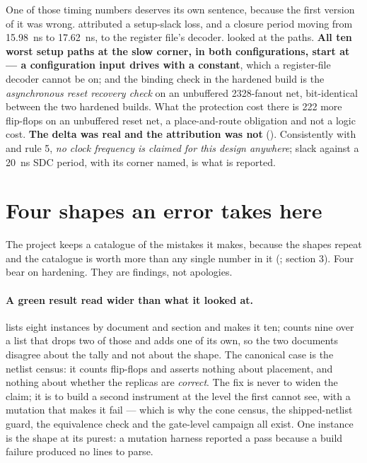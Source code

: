 One of those timing numbers deserves its own sentence, because the first
version of it was wrong.  attributed a
setup-slack loss, and a closure period moving from
\SI{15.98}{\nano\second} to \SI{17.62}{\nano\second}, to the register
file's decoder.  looked at the paths. \textbf{All ten worst
setup paths at the slow corner, in both configurations, start at
 --- a configuration input 
drives with a constant}, which a register-file decoder cannot be on; and
the binding check in the hardened build is the \emph{asynchronous reset
recovery check} on an unbuffered \num{2328}-fanout net, bit-identical
between the two hardened builds. What the protection cost there is 222
more flip-flops on an unbuffered reset net, a place-and-route obligation
and not a logic cost. \textbf{The delta was real and the attribution was
not} (). Consistently with
 and  rule 5, \emph{no clock
frequency is claimed for this design anywhere}; slack against a
\SI{20}{\nano\second} SDC period, with its corner named, is what is
reported.

\section{Four shapes an error takes here}
\label{sec:harden-shapes}

The project keeps a catalogue of the mistakes it makes, because the
shapes repeat and the catalogue is worth more than any single number in
it (;  section 3). Four bear on
hardening. They are findings, not apologies.

\paragraph{A green result read wider than what it looked at.}
 lists eight instances by document and section
and  makes it ten;  counts
nine over a list that drops two of those and adds one of its own, so the
two documents disagree about the tally and not about the shape. The
canonical case is the netlist census: it counts flip-flops and asserts
nothing about placement, and nothing about whether the replicas are
\emph{correct}. The fix is never to widen the
claim; it is to build a second instrument at the level the
first cannot see, with a mutation that makes it fail --- which is why
the cone census, the shipped-netlist guard, the equivalence check and
the gate-level campaign all exist. One instance is the shape at its
purest: a mutation harness reported a pass because a build failure
produced no  lines to parse.

